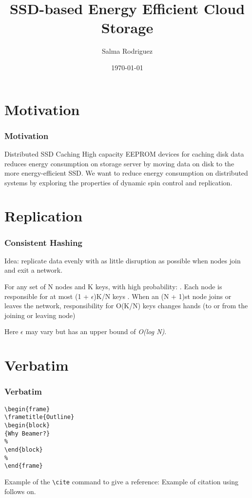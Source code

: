 \documentclass{beamer}
\title[the title]{SSD-based Energy Efficient Cloud Storage}
\author{Salma Rodriguez}
\institute[University] {
Florida International University \\
\medskip
{\emph{srodr063@fiu.edu}}}
\date{\today}
\begin{document}
%
\begin{frame}
\titlepage
\end{frame}
%
\section{Motivation}
\begin{frame}
\frametitle{Motivation}
\begin{block}
{Distributed SSD Caching}
High capacity EEPROM devices for caching disk data
reduces energy consumption on storage server by moving
data on disk to the more energy-efficient SSD. We want
to reduce energy consumption on distributed systems by
exploring the properties of dynamic spin control and
replication.
\end{block}
\end{frame}
%
\section{Replication}
\begin{frame}
\frametitle{Consistent Hashing}
Idea: replicate data evenly with as little disruption
as possible when nodes join and exit a network. \\
\begin{theorem}
For any set of N nodes and K keys, with high probability:
\newline{}. Each node is responsible for at most (1 + $\epsilon$)K/N keys
\newline{}. When an (N + 1)st node joins or leaves the network,
   responsibility for O(K/N) keys changes hands (to or from
   the joining or leaving node)
\end{theorem}
Here $\epsilon$ may vary but has an upper bound of \textit{O(log N)}.
\end{frame}
%
\section{Verbatim}
\begin{frame}[fragile]
\frametitle{Verbatim}
\begin{example}
\begin{verbatim}
\begin{frame}
\frametitle{Outline}
\begin{block}
{Why Beamer?}
%
\end{block}
%
\end{frame}\end{verbatim}
\end{example}
\end{frame}
%
\begin{frame}[fragile]
%
Example of the \verb|\cite| command to give a reference:
Example of citation using \cite{key1} follows on.
\end{frame}
%
\end{document}
